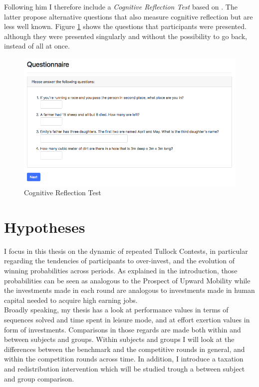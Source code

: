     Following him I therefore include a \textit{Cognitive Reflection Test} based on \cite{thomson2016}. The latter propose alternative questions that also measure cognitive reflection but are less well known. Figure \ref{fig:crt_quest} shows the questions that participants were presented. although they were presented singularly and without the possibility to go back, instead of all at once.
    
    \begin{figure}
        \centering
        \includegraphics[width=\textwidth]{graphs/CRT_Quest.png}
        \caption{Cognitive Reflection Test \citep{thomson2016}}
        \label{fig:crt_quest}
    \end{figure}
    
    \section{Hypotheses}\label{ss:hyp}
    
    I focus in this thesis on the dynamic of repeated Tullock Contests, in particular regarding the tendencies of participants to over-invest, and the evolution of winning probabilities across periods. As explained in the introduction, those probabilities can be seen as analogous to the Prospect of Upward Mobility while the investments made in each round are analogous to investments made in human capital needed to acquire high earning jobs.\\
    
    Broadly speaking, my thesis has a look at performance values in terms of sequences solved and time spent in leisure mode, and at effort exertion values in form of investments. Comparisons in those regards are made both within and between subjects and groups. Within subjects and groups I will look at the differences between the benchmark and the competitive rounds in general, and within the competition rounds across time. In addition, I introduce a taxation and redistribution intervention which will be studied trough a between subject and group comparison.\\
    
